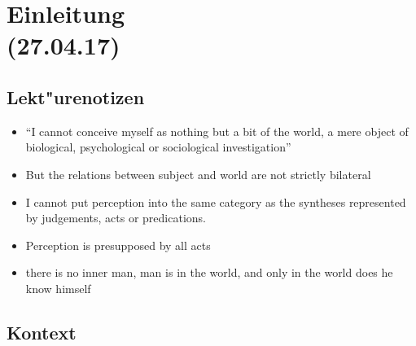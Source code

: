 \documentclass[emulatestandardclasses]{scrartcl}
\begin{document}
\section{Einleitung\\(27.04.17)}

\subsection{Lekt"urenotizen}

\begin{itemize}
  \item "`I cannot conceive myself as nothing but a bit of the world, a mere object of biological, psychological or sociological investigation"'
  \item But the relations between subject and world are not strictly bilateral
  \item I cannot put perception into the same category as the syntheses represented by judgements, acts or predications. 
  \item Perception is presupposed by all acts
  \item there is no inner man, man is in the world, and only in the world does he know himself
\end{itemize}

\subsection{Kontext}
\end{document}
